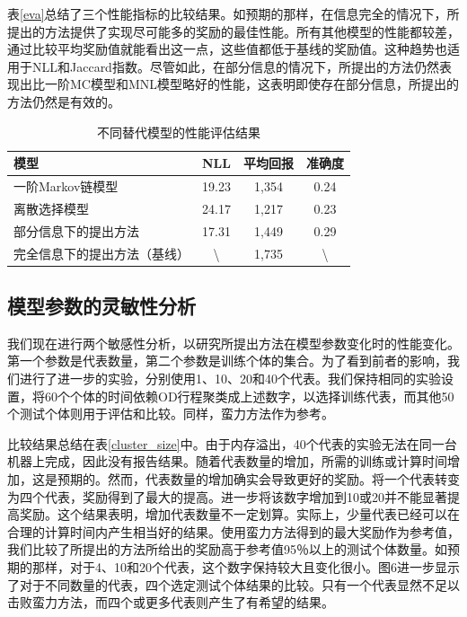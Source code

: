 表\ref{eva}总结了三个性能指标的比较结果。如预期的那样，在信息完全的情况下，所提出的方法提供了实现尽可能多的奖励的最佳性能。所有其他模型的性能都较差，通过比较平均奖励值就能看出这一点，这些值都低于基线的奖励值。这种趋势也适用于NLL和Jaccard指数。尽管如此，在部分信息的情况下，所提出的方法仍然表现出比一阶MC模型和MNL模型略好的性能，这表明即使存在部分信息，所提出的方法仍然是有效的。

\begin{table}[htbp]
\centering
\caption{不同替代模型的性能评估结果}
\label{tab:eva}
\renewcommand{\arraystretch}{1.2} %
\setlength{\tabcolsep}{8mm} %
\small %

\begin{tabular}{lccc}
\toprule
模型 & NLL & 平均回报 & 准确度 \\
\midrule
一阶Markov链模型 & 19.23 & 1,354 & 0.24 \\
离散选择模型 & 24.17 & 1,217 & 0.23 \\
部分信息下的提出方法 & 17.31 & 1,449 & 0.29 \\
完全信息下的提出方法（基线） & \textbackslash{} & 1,735 & \textbackslash{} \\
\bottomrule
\end{tabular}
\end{table}

\subsection{模型参数的灵敏性分析}

我们现在进行两个敏感性分析，以研究所提出方法在模型参数变化时的性能变化。第一个参数是代表数量，第二个参数是训练个体的集合。为了看到前者的影响，我们进行了进一步的实验，分别使用1、10、20和40个代表。我们保持相同的实验设置，将60个个体的时间依赖OD行程聚类成上述数字，以选择训练代表，而其他50个测试个体则用于评估和比较。同样，蛮力方法作为参考。

比较结果总结在表\ref{cluster_size}中。由于内存溢出，40个代表的实验无法在同一台机器上完成，因此没有报告结果。随着代表数量的增加，所需的训练或计算时间增加，这是预期的。然而，代表数量的增加确实会导致更好的奖励。将一个代表转变为四个代表，奖励得到了最大的提高。进一步将该数字增加到10或20并不能显著提高奖励。这个结果表明，增加代表数量不一定划算。实际上，少量代表已经可以在合理的计算时间内产生相当好的结果。使用蛮力方法得到的最大奖励作为参考值，我们比较了所提出的方法所给出的奖励高于参考值95％以上的测试个体数量。如预期的那样，对于4、10和20个代表，这个数字保持较大且变化很小。图6进一步显示了对于不同数量的代表，四个选定测试个体结果的比较。只有一个代表显然不足以击败蛮力方法，而四个或更多代表则产生了有希望的结果。

